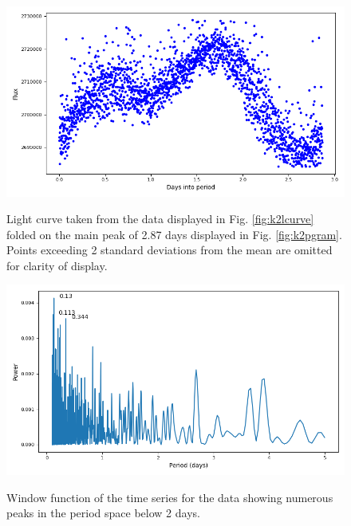 \begin{figure}[!htbp]
\begin{center}
\includegraphics[scale=0.40]{k2/images/k2_pfold.png} \\
\vspace{-.5cm}
\end{center}   
\caption{Light curve taken from the data displayed in Fig.
\ref{fig:k2lcurve} folded on the main peak of 2.87 days displayed in Fig.
\ref{fig:k2pgram}. Points exceeding 2 standard deviations from the mean are
omitted for clarity of display.} \protect\label{fig:k2pfold}
\end{figure}

\begin{figure}[!htbp]
\begin{center}
\includegraphics[scale=0.40]{k2/images/k2winfunc.png} \\
\vspace{-.5cm}
\end{center}   
\caption{Window function of the time series for the {\ktwo} data showing numerous
peaks in the period space below 2 days.} \protect\label{fig:k2winfunc}
\end{figure}

